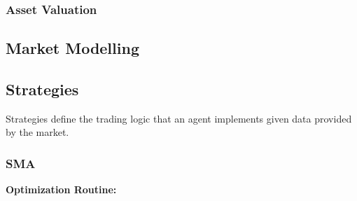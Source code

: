 \subsubsection{Asset Valuation} \label{sec::ch4_AssetValuation}


\subsection{Market Modelling} \label{sec::ch4_MarketModelling}


\subsection{}









\subsection{Strategies}
Strategies define the trading logic that an agent implements given data provided by the market.
\subsubsection{\ac{SMA}}
\textbf{Optimization Routine:} 

